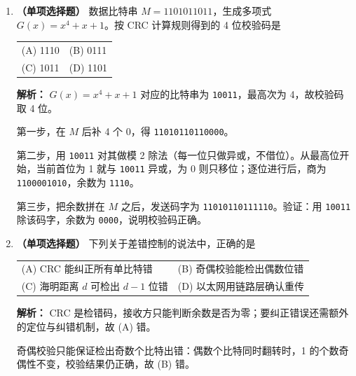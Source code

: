 \begin{enumerate}
字节填充法用特殊字节（如帧定界符）标记帧边界；当数据中恰好出现与定界字节或转义字节相同的字节时，必须在其前插入转义字节（如 ESC），接收方再删除转义字节，故 (B) 对。

零比特填充法面向比特流，典型用于 HDLC，不要求链路是面向字符的，故 (C) 错。

违规编码法利用物理层编码中不允许出现的码型（如曼彻斯特编码中不合法的跳变）表示帧边界，并不增加校验位，故 (D) 错。\else \answerarea \fi

\item \textbf{（单项选择题）} 数据比特串 $M=1101011011$，生成多项式 $G(x)=x^4+x+1$。按 CRC 计算规则得到的 4 位校验码是
\begin{center}
\begin{tabular}{ll}
(A) 1110 & (B) 0111 \\[4pt]
(C) 1011 & (D) 1101
\end{tabular}
\end{center}

\ifshowsolutions\par\noindent\textbf{解析：} $G(x)=x^4+x+1$ 对应的比特串为 \texttt{10011}，最高次为 4，故校验码取 4 位。

第一步，在 $M$ 后补 4 个 0，得 \texttt{11010110110000}。

第二步，用 \texttt{10011} 对其做模 2 除法（每一位只做异或，不借位）。从最高位开始，当前首位为 1 就与 \texttt{10011} 异或，为 0 则只移位；逐位进行后，商为 \texttt{1100001010}，余数为 \texttt{1110}。

第三步，把余数拼在 $M$ 之后，发送码字为 \texttt{11010110111110}。验证：用 \texttt{10011} 除该码字，余数为 \texttt{0000}，说明校验码正确。\else \answerarea \fi

\item \textbf{（单项选择题）} 下列关于差错控制的说法中，正确的是
\begin{center}\small
\begin{tabular}{@{}ll@{}}
(A) CRC 能纠正所有单比特错 & (B) 奇偶校验能检出偶数位错 \\[4pt]
(C) 海明距离 $d$ 可检出 $d-1$ 位错 & (D) 以太网用链路层确认重传
\end{tabular}
\end{center}

\ifshowsolutions\par\noindent\textbf{解析：} CRC 是检错码，接收方只能判断余数是否为零；要纠正错误还需额外的定位与纠错机制，故 (A) 错。

奇偶校验只能保证检出奇数个比特出错：偶数个比特同时翻转时，1 的个数奇偶性不变，校验结果仍正确，故 (B) 错。


\end{enumerate}
